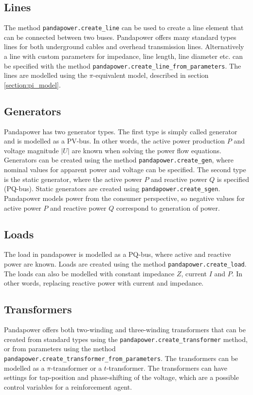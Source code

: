 \documentclass[class=book, crop=false, 11pt]{standalone}
\begin{document}
\subsection*{Lines}
The method \texttt{pandapower.create\_line} can be used to create a line element that can be connected between two buses. Pandapower offers many standard types lines for both underground cables and overhead transmission lines. Alternatively a line with custom parameters for impedance, line length, line diameter etc. can be specified with the method \texttt{pandapower.create\_line\_from\_parameters}. The lines are modelled using the $\pi$-equivalent model, described in section \ref{section:pi_model}.

\subsection*{Generators}
Pandapower has two generator types. The first type is simply called generator and is modelled as a PV-bus. In other words, the active power production $P$ and voltage magnitude $|U|$ are known when solving the power flow equations. Generators can be created using the method \texttt{pandapower.create\_gen}, where nominal values for apparent power and voltage can be specified. The second type is the static generator, where the active power $P$ and reactive power $Q$ is specified (PQ-bus). Static generators are created using \texttt{pandapower.create\_sgen}. Pandapower models power from the consumer perspective, so negative values for active power $P$ and reactive power $Q$ correspond to generation of power.

\subsection*{Loads}
The load in pandapower is modelled as a PQ-bus, where active and reactive power are known. Loads are created using the method \texttt{pandapower.create\_load}. The loads can also be modelled with constant impedance $Z$, current $I$ and $P$. In other words, replacing reactive power with current and impedance.

\subsection*{Transformers}
Pandapower offers both two-winding and three-winding transformers that can be created from standard types using the \texttt{pandapower.create\_transformer} method, or from parameters using the method
\texttt{pandapower.create\_transformer\_from\_parameters}. The transformers can be modelled as a $\pi$-transformer or a $t$-transformer. The transformers can have settings for tap-position and phase-shifting of the voltage, which are a possible control variables for a reinforcement agent.  
\end{document}
